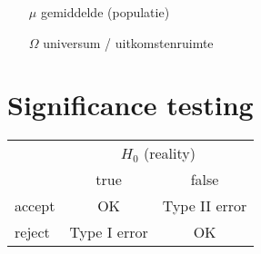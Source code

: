 \documentclass[a4paper]{article}
\begin{document}
\begin{itemize}
\item[$\mu$] gemiddelde (populatie)
\item[$\Omega$] universum / uitkomstenruimte
\end{itemize}

\section{Significance testing}

\begin{tabular}{l|c|c}
& \multicolumn{2}{c}{$H_{0}$ (reality)} \\
& true & false \\ \hline
accept & OK & Type II error \\
reject & Type I error & OK \\
\end{tabular}

\onecolumn
\end{document}
